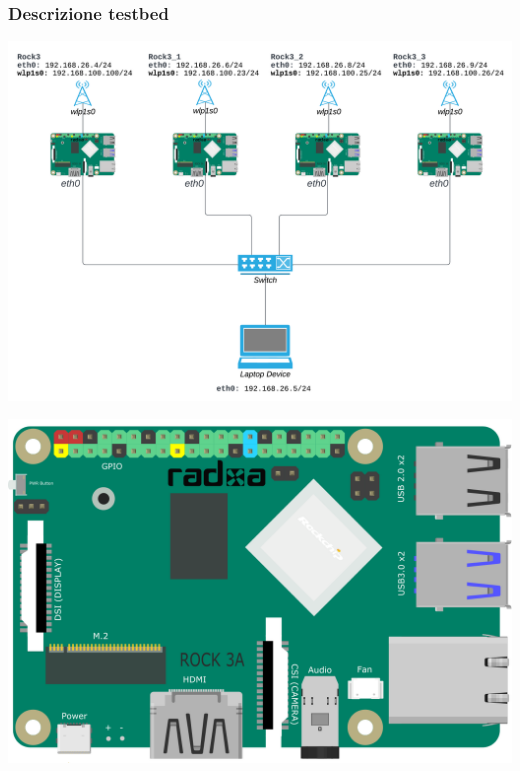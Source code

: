\documentclass{beamer}
\begin{document}
\begin{frame}
    \frametitle{Descrizione testbed}
    \centering
    \begin{minipage}{0.6\textwidth}
        \includegraphics[width=\textwidth]{topology.png}
    \end{minipage}
    \hfill
    \begin{minipage}{0.35\textwidth}
        \centering
        \includegraphics[width=\textwidth]{ROCK_3A.png}
        \vspace{0.5cm}

\end{minipage}
\end{frame}
\end{document}
